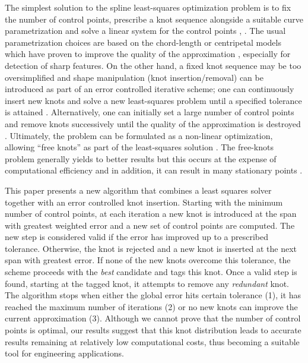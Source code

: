 \documentclass[a4paper,12pt]{article}
\begin{document}
  The simplest solution to the spline least-squares optimization problem is to fix the number of control points,
  prescribe a knot sequence alongside a suitable curve parametrization and solve a linear system for the 
  control points \cite[Ch. 9.4]{nurbs_book}, \cite{deboor1968}. 
  The usual parametrization choices are based on the chord-length or centripetal models  which 
  have proven to improve the quality of the approximation \cite{hoschek1988,speer1998,lee1989, ma1995}, 
  especially for detection of sharp features. 
  On the other hand, a fixed knot sequence may be too oversimplified and 
  shape manipulation (knot insertion/removal) \cite{piegl1989, boehm1980, goldman1992} 
   can be introduced as part of an error controlled iterative scheme; 
   one can continuously insert new knots and solve a new least-squares problem until a specified tolerance is attained
    \cite{piegl2000, park2007}. Alternatively, one can  initially set a large number of control points and remove knots successively until the 
     quality of the approximation is destroyed \cite{lyche1987, tiller1992}. 
   Ultimately, the problem can be formulated as a non-linear optimization, allowing 
   ``free knots'' as part of the least-squares solution \cite{schwetlick1995least, beliakov2004}. 
   The free-knots problem generally yields to better results but this occurs at the expense 
   of computational efficiency \cite{randrzanarivony2002} and in addition, it can result 
   in many stationary points \cite{jupp1978}. 

   This paper presents a new algorithm that combines 
   a least squares solver together with an error controlled knot insertion. 
   Starting with the minimum number of control points, at each iteration a new knot is introduced 
   at the span with greatest weighted error and a new set of control points are computed. The new step is considered valid if the error has improved up to a prescribed tolerance. 
    Otherwise, the knot is rejected and a new knot is inserted at the next span with greatest error. 
    If none of the new knots overcome this tolerance, the scheme proceeds with the \emph{best} candidate and tags this knot. 
    Once a valid step is found,  starting at the tagged knot, 
    it attempts to remove any \emph{redundant} knot.
    The algorithm stops when either the global error hits certain tolerance (1), it has 
    reached the maximum number of iterations (2) or no new knots can improve the current approximation (3). 
  Although we cannot prove that the number of control points is optimal, 
  our results suggest that this knot distribution leads to accurate results
  remaining at relatively low computational costs, thus becoming a 
  suitable tool for engineering applications. 
  
\end{document}
